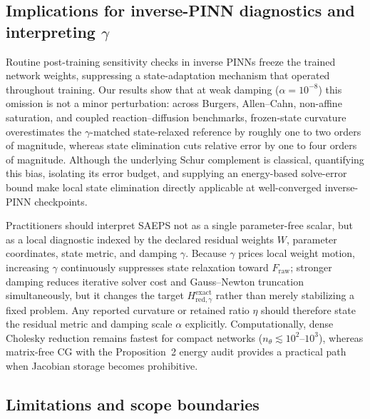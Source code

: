 \documentclass[preprint,11pt]{elsarticle}
\newcommand{\Fraw}{F_{\mathrm{raw}}}
\newcommand{\Hred}{H_{\mathrm{red},\gamma}^{\mathrm{exact}}}
\begin{document}
\subsection{Implications for inverse-PINN diagnostics and interpreting \texorpdfstring{$\gamma$}{gamma}}
\label{sec:interpretation}

Routine post-training sensitivity checks in inverse PINNs freeze the trained network weights, suppressing a state-adaptation mechanism that operated throughout training.
Our results show that at weak damping ($\alpha=10^{-8}$) this omission is not a minor perturbation: across Burgers, Allen--Cahn, non-affine saturation, and coupled reaction--diffusion benchmarks, frozen-state curvature overestimates the $\gamma$-matched state-relaxed reference by roughly one to two orders of magnitude, whereas state elimination cuts relative error by one to four orders of magnitude.
Although the underlying Schur complement is classical, quantifying this bias, isolating its error budget, and supplying an energy-based solve-error bound make local state elimination directly applicable at well-converged inverse-PINN checkpoints.

Practitioners should interpret SAEPS not as a single parameter-free scalar, but as a local diagnostic indexed by the declared residual weights $W$, parameter coordinates, state metric, and damping $\gamma$.
Because $\gamma$ prices local weight motion, increasing $\gamma$ continuously suppresses state relaxation toward $\Fraw$; stronger damping reduces iterative solver cost and Gauss--Newton truncation simultaneously, but it changes the target $\Hred$ rather than merely stabilizing a fixed problem.
Any reported curvature or retained ratio $\eta$ should therefore state the residual metric and damping scale $\alpha$ explicitly.
Computationally, dense Cholesky reduction remains fastest for compact networks ($n_\theta\lesssim 10^2$--$10^3$), whereas matrix-free CG with the Proposition~2 energy audit provides a practical path when Jacobian storage becomes prohibitive.

\subsection{Limitations and scope boundaries}
\label{sec:limitations}
\end{document}
